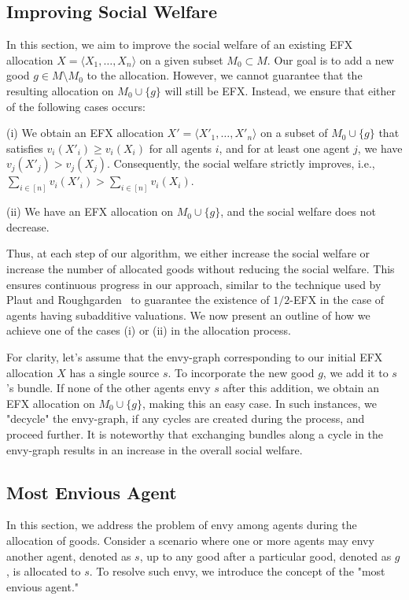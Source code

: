 \documentclass{article}
\begin{document}
\subsection{Improving Social Welfare}

In this section, we aim to improve the social welfare of an existing EFX allocation \(X = \langle X_1, \ldots, X_n\rangle \) on a given subset \(M_0 \subset M\). Our goal is to add a new good \(g \in M \setminus M_0\) to the allocation. However, we cannot guarantee that the resulting allocation on \(M_0 \cup \{g\}\) will still be EFX. Instead, we ensure that either of the following cases occurs:

(i) We obtain an EFX allocation \(X' = \langle X'_{1}, \ldots, X'_{n}\rangle\) on a subset of \(M_0 \cup \{g\}\) that satisfies \(v_i(X'_{i}) \geq v_i(X_i)\) for all agents \(i\), and for at least one agent \(j\), we have \(v_j(X'_{j}) > v_j(X_j)\). Consequently, the social welfare strictly improves, i.e., \(\sum_{i \in [n]} v_i(X'_{i}) > \sum_{i \in [n]} v_i(X_i)\).

(ii) We have an EFX allocation on \(M_0 \cup \{g\}\), and the social welfare does not decrease.

Thus, at each step of our algorithm, we either increase the social welfare or increase the number of allocated goods without reducing the social welfare. This ensures continuous progress in our approach, similar to the technique used by Plaut and Roughgarden~\cite{DBLP:journals/corr/PlautR17} to guarantee the existence of $1/2$-EFX in the case of agents having subadditive valuations. We now present an outline of how we achieve one of the cases (i) or (ii) in the allocation process.

For clarity, let's assume that the envy-graph corresponding to our initial EFX allocation \(X\) has a single source \(s\). To incorporate the new good \(g\), we add it to \(s\)'s bundle. If none of the other agents envy \(s\) after this addition, we obtain an EFX allocation on \(M_0 \cup \{g\}\), making this an easy case. In such instances, we "decycle" the envy-graph, if any cycles are created during the process, and proceed further. It is noteworthy that exchanging bundles along a cycle in the envy-graph results in an increase in the overall social welfare.

\subsection{Most Envious Agent}

In this section, we address the problem of envy among agents during the allocation of goods. Consider a scenario where one or more agents may envy another agent, denoted as $s$, up to any good after a particular good, denoted as $g$, is allocated to $s$. To resolve such envy, we introduce the concept of the "most envious agent."
\end{document}
